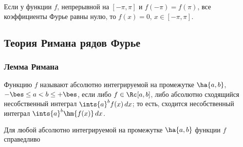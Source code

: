 \documentclass[a4paper]{article}
\newenvironment{imp*}{\par\vskip\theoremskip\textbf{Следствие.}\normalfont \itshape}{\par\vskip\theoremskip}
\begin{document}
\begin{imp*}
Если у функции $f$, непрерывной на $[-\pi,\pi]$ и $f(-\pi)=f(\pi)$,
все коэффициенты Фурье равны нулю, то $f(x)=0$, $x\in[-\pi,\pi]$.
\end{imp*}

\subsection{Теория Римана рядов Фурье}

\subsubsection{Лемма Римана}

Функцию $f$ называют абсолютно интегрируемой на промежутке
$\ha{a,b}$, $-\bes\le a < b \le +\bes$, если либо $f\in\Rc[a,b]$,
либо абсолютно сходящийся несобственный интеграл $\ints{a}^b
f(x)\,dx$; то есть, сходится несобственный интеграл $\ints{a}^b
\hm{f(x)}\,dx$.

\begin{theorem}
Для любой абсолютно интегрируемой на промежутке $\ha{a,b}$ функции
$f$ справедливо 
\end{theorem}
\end{document}
